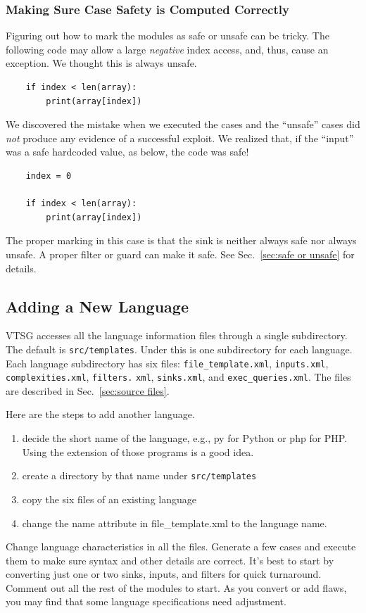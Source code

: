 \subsubsection{Making Sure Case Safety is Computed Correctly}

Figuring out how to mark the modules as safe or unsafe can be tricky.
The following code may allow a large \emph{negative} index access, and, thus, cause an
exception.  We thought this is always unsafe.
\begin{verbatim}
    if index < len(array):
        print(array[index])
\end{verbatim}
We discovered the mistake when we executed the cases and the ``unsafe'' cases did
\emph{not} produce any evidence of a successful exploit.  We realized that, if the
``input'' was a safe hardcoded
value, as below, the code was safe!
\begin{verbatim}
    index = 0

    if index < len(array):
        print(array[index])
\end{verbatim}
The proper marking in this case is that the sink is neither always safe nor always unsafe.
A proper filter or guard can make it safe.
See Sec.~\ref{sec:safe or unsafe} for details.

\subsection{Adding a New Language}
\label{sec:add a language}

\label{sec: language directory structure}
VTSG accesses all the language information files through a
single subdirectory.  The default is \verb|src/templates|.  Under this is one
subdirectory for each language.  Each language subdirectory has six files:
\verb|file_template.xml|, \verb|inputs.xml|, \verb|complexities.xml|,
\verb|filters.| \verb|xml|, \verb|sinks.xml|, and \verb|exec_queries.xml|.  The files
are described in Sec.~\ref{sec:source files}.

Here are the steps to add another language.
\begin{enumerate}[nosep]
\item decide the short name of the language, e.g., py for Python or php for
  PHP.  Using the extension of those programs is a good idea.
\item create a directory by that name under \verb|src/templates|
\item copy the six files of an existing language
\item change the name attribute in file\_template.xml to the language name.
\end{enumerate}
Change language characteristics in all the files.  Generate a few cases and
execute them to make sure syntax and other details are correct.  It's best to
start by converting just one or two sinks, inputs, and filters for quick turnaround.
Comment out all the rest of the modules to start.
As you convert or add flaws, you may find that some language specifications need
adjustment.

